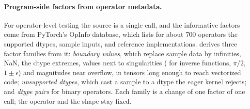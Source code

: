 

\paragraph{Program-side factors from operator metadata.} For operator-level testing the source is a single
call, and the informative factors come from PyTorch's OpInfo database, which lists for about 700 operators the
supported dtypes, sample inputs, and reference implementations. \tool derives three factor families from it:
\emph{boundary values}, which replace sample data by infinities, NaN, the dtype extremes, values next to
singularities ( for inverse functions, $\pi/2$, $1 \pm \epsilon$) and magnitudes near
overflow, in tensors long enough to reach vectorized code; \emph{unsupported dtypes}, which cast a sample to a
dtype the eager kernel rejects; and \emph{dtype pairs} for binary operators. Each family is a change of one
factor of one call; the operator and the shape stay fixed.

